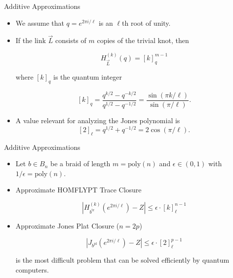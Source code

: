 \documentclass[slideColor]{prosper}
\renewcommand{\>}{\rangle}
\newcommand{\<}{\langle}
\begin{document}
\begin{slide}{Additive Approximations}
\vspace{-0.1cm}
\begin{itemize}
\item We assume that $q=e^{2\pi i/\ell}$ is an $\ell$th root of unity.

\medskip
\item If the link $\vec{L}$ consists of $m$ copies of the trivial knot, then 

\[
H^{(k)}_{\overrightarrow{L}}(q) = [k]_q^{m-1}
\]

\medskip
where $[k]_q$ is the quantum integer

\[
{[k]}_q = \frac{q^{k/2} - q^{-k/2}}{q^{1/2} - q^{-1/2}} = \frac{\sin(\pi k/\ell)}{\sin(\pi/\ell)}.
\]

\medskip
\item A value relevant for analyzing the Jones polynomial is
\[
{[2]}_\ell = q^{1/2} + q^{-1/2} = 2\cos(\pi/\ell). 
\]
\end{itemize}

\end{slide}


\begin{slide}{Additive Approximations}

\begin{itemize}

\item Let $b\in B_n$ be a braid of length $m=\mathrm{poly}(n)$ and $\epsilon\in (0,1)$ with $1/\epsilon=\mathrm{poly}(n)$.

\bigskip
\item Approximate HOMFLYPT Trace Closure

\[
\left| H^{(k)}_{b^{\mathrm{tr}}}(e^{2\pi i/\ell}) - Z \right| \leq \epsilon \cdot [k]_\ell^{n-1}
\]

\bigskip
\item Approximate Jones Plat Closure ($n=2p$)

\[
\left| J_{b^{\mathrm{pl}}}(e^{2\pi i/\ell}) - Z \right| \leq \epsilon \cdot [2]_\ell^{p-1}
\]

\medskip
is the most difficult problem that can be solved efficiently by quantum computers.

\end{itemize}

\end{slide}

\end{document}
